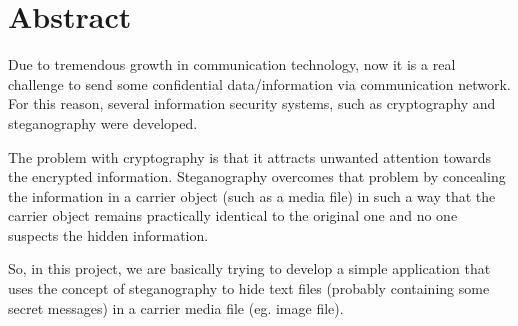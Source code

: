 \section*{Abstract}

Due to tremendous growth in communication technology, now it is a real
challenge to send some confidential data/information via communication
network. For this reason, several information security systems, such as
cryptography and steganography were developed.

The problem with cryptography is that it attracts unwanted attention
towards the encrypted information. Steganography overcomes that problem
by concealing the information in a carrier object (such as a media file)
in such a way that the carrier object remains practically identical to
the original one and no one suspects the hidden information.

So, in this project, we are basically trying to develop a simple
application that uses the concept of steganography to hide text files
(probably containing some secret messages) in a carrier media file
(eg. image file).

